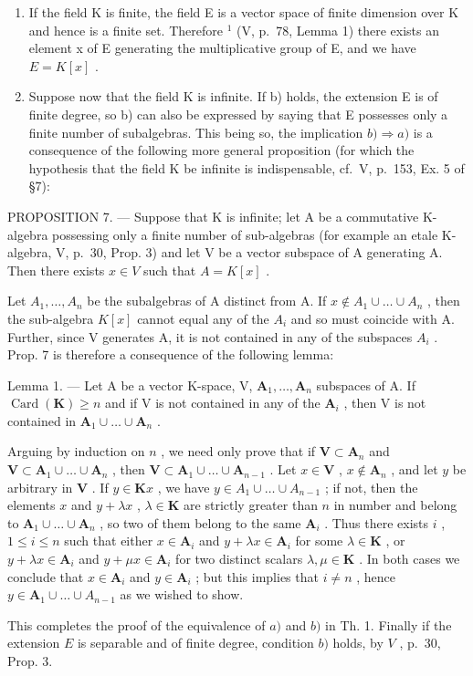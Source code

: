 \begin{enumerate}
\def\labelenumi{\Alph{enumi})}
\item
  If the field K is finite, the field E is a vector space of finite dimension over K and hence is a finite set. Therefore \({}^{1}\) (V, p.~78, Lemma 1) there exists an element x of E generating the multiplicative group of E, and we have \(E = K[x]\) .
\item
  Suppose now that the field K is infinite. If b) holds, the extension E is of finite degree, so b) can also be expressed by saying that E possesses only a finite number of subalgebras. This being so, the implication \(b) \Rightarrow a)\) is a consequence of the following more general proposition (for which the hypothesis that the field K be infinite is indispensable, cf.~V, p.~153, Ex. 5 of §7):
\end{enumerate}

PROPOSITION 7. --- Suppose that K is infinite; let A be a commutative K-algebra possessing only a finite number of sub-algebras (for example an etale K-algebra, V, p.~30, Prop. 3) and let V be a vector subspace of A generating A. Then there exists \(x \in V\) such that \(A = K[x]\) .

Let \(A_{1}, \ldots, A_{n}\) be the subalgebras of A distinct from A. If \(x \notin A_{1} \cup \ldots \cup A_{n}\) , then the sub-algebra \(K[x]\) cannot equal any of the \(A_{i}\) and so must coincide with A. Further, since V generates A, it is not contained in any of the subspaces \(A_{i}\) . Prop. 7 is therefore a consequence of the following lemma:

Lemma 1. --- Let A be a vector K-space, V, \(\mathbf{A}_1, \ldots, \mathbf{A}_n\) subspaces of A. If \(\operatorname{Card}(\mathbf{K}) \geqslant n\) and if V is not contained in any of the \(\mathbf{A}_i\) , then V is not contained in \(\mathbf{A}_1 \cup \ldots \cup \mathbf{A}_n\) .

Arguing by induction on \(n\) , we need only prove that if \(\mathbf{V} \subset \mathbf{A}_n\) and \(\mathbf{V} \subset \mathbf{A}_1 \cup \ldots \cup \mathbf{A}_n\) , then \(\mathbf{V} \subset \mathbf{A}_1 \cup \ldots \cup \mathbf{A}_{n-1}\) . Let \(x \in \mathbf{V}\) , \(x \notin \mathbf{A}_n\) , and let \(y\) be arbitrary in \(\mathbf{V}\) . If \(y \in \mathbf{K}x\) , we have \(y \in A_1 \cup \ldots \cup A_{n-1}\) ; if not, then the elements \(x\) and \(y + \lambda x\) , \(\lambda \in \mathbf{K}\) are strictly greater than \(n\) in number and belong to \(\mathbf{A}_1 \cup \ldots \cup \mathbf{A}_n\) , so two of them belong to the same \(\mathbf{A}_i\) . Thus there exists \(i\) , \(1 \leqslant i \leqslant n\) such that either \(x \in \mathbf{A}_i\) and \(y + \lambda x \in \mathbf{A}_i\) for some \(\lambda \in \mathbf{K}\) , or \(y + \lambda x \in \mathbf{A}_i\) and \(y + \mu x \in \mathbf{A}_i\) for two distinct scalars \(\lambda, \mu \in \mathbf{K}\) . In both cases we conclude that \(x \in \mathbf{A}_i\) and \(y \in \mathbf{A}_i\) ; but this implies that \(i \neq n\) , hence \(y \in \mathbf{A}_1 \cup \ldots \cup A_{n-1}\) as we wished to show.

This completes the proof of the equivalence of \(a)\) and \(b)\) in Th. 1. Finally if the extension \(E\) is separable and of finite degree, condition \(b)\) holds, by \(V\) , p.~30, Prop. 3.

